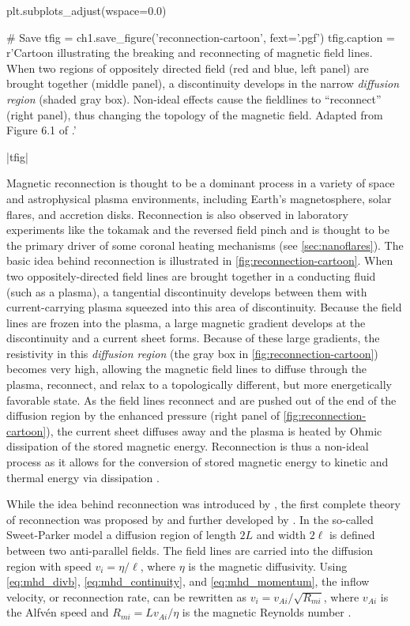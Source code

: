 \begin{pycode}[chapter1]
plt.subplots_adjust(wspace=0.0)

# Save
tfig = ch1.save_figure('reconnection-cartoon', fext='.pgf')
tfig.caption = r'Cartoon illustrating the breaking and reconnecting of magnetic field lines. When two regions of oppositely directed field (red and blue, left panel) are brought together (middle panel), a discontinuity develops in the narrow \textit{diffusion region} (shaded gray box). Non-ideal effects cause the fieldlines to ``reconnect'' (right panel), thus changing the topology of the magnetic field. Adapted from Figure 6.1 of \citet{priest_magnetohydrodynamics_2014}.'
\end{pycode}
\py[chapter1]|tfig|

Magnetic reconnection is thought to be a dominant process in a variety of space and astrophysical plasma environments, including Earth's magnetosphere, solar flares, and accretion disks. Reconnection is also observed in laboratory experiments like the tokamak and the reversed field pinch \citep{priest_magnetic_2000} and is thought to be the primary driver of some coronal heating mechanisms (see \autoref{sec:nanoflares}). The basic idea behind reconnection is illustrated in \autoref{fig:reconnection-cartoon}. When two oppositely-directed field lines are brought together in a conducting fluid (such as a plasma), a tangential discontinuity develops between them with current-carrying plasma squeezed into this area of discontinuity. Because the field lines are frozen into the plasma, a large magnetic gradient develops at the discontinuity and a current sheet forms. Because of these large gradients, the resistivity in this \textit{diffusion region} (the gray box in \autoref{fig:reconnection-cartoon}) becomes very high, allowing the magnetic field lines to diffuse through the plasma, reconnect, and relax to a topologically different, but more energetically favorable state. As the field lines reconnect and are pushed out of the end of the diffusion region by the enhanced pressure (right panel of \autoref{fig:reconnection-cartoon}), the current sheet diffuses away and the plasma is heated by Ohmic dissipation of the stored magnetic energy. Reconnection is thus a non-ideal process as it allows for the conversion of stored magnetic energy to kinetic and thermal energy via dissipation \citep{priest_magnetic_2000,priest_magnetohydrodynamics_2014}.

While the idea behind reconnection was introduced by \citet{dungey_conditions_1953}, the first complete theory of reconnection was proposed by \citet{sweet_neutral_1958} and further developed by \citet{parker_sweets_1957,parker_solar-flare_1963}. In the so-called Sweet-Parker model a diffusion region of length $2L$ and width $2\ell$ is defined between two anti-parallel fields. The field lines are carried into the diffusion region with speed $v_i=\eta/\ell$, where $\eta$ is the magnetic diffusivity. Using \autoref{eq:mhd_divb}, \autoref{eq:mhd_continuity}, and \autoref{eq:mhd_momentum}, the inflow velocity, or reconnection rate, can be rewritten as $v_i=v_{Ai}/\sqrt{R_{mi}}$, where $v_{Ai}$ is the Alfv\'{e}n speed and $R_{mi}=Lv_{Ai}/\eta$ is the magnetic Reynolds number \citep{priest_magnetic_2000}. 

